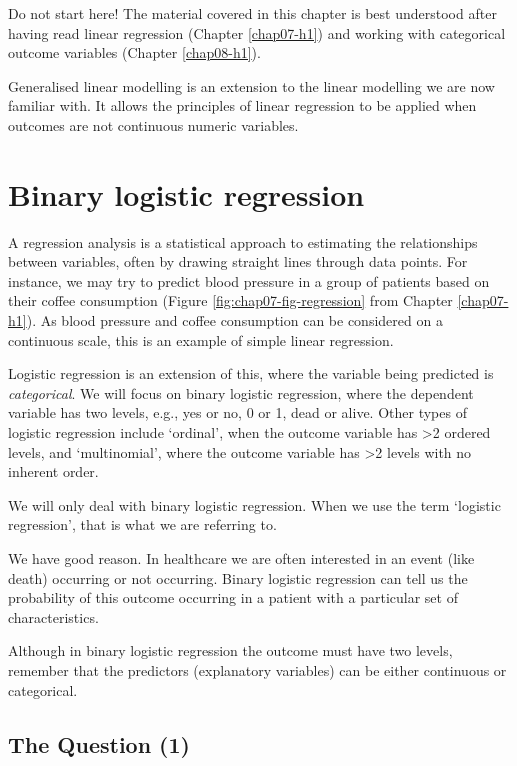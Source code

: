 \documentclass[
  12pt,
  krantz2]{krantz}
\begin{document}
Do not start here!
The material covered in this chapter is best understood after having read linear regression (Chapter \ref{chap07-h1}) and working with categorical outcome variables (Chapter \ref{chap08-h1}).

Generalised linear modelling is an extension to the linear modelling we are now familiar with.
It allows the principles of linear regression to be applied when outcomes are not continuous numeric variables.

\hypertarget{binary-logistic-regression}{%
\section{Binary logistic regression}\label{binary-logistic-regression}}


A regression analysis is a statistical approach to estimating the relationships between variables, often by drawing straight lines through data points.
For instance, we may try to predict blood pressure in a group of patients based on their coffee consumption (Figure \ref{fig:chap07-fig-regression} from Chapter \ref{chap07-h1}).
As blood pressure and coffee consumption can be considered on a continuous scale, this is an example of simple linear regression.

Logistic regression is an extension of this, where the variable being predicted is \emph{categorical}.
We will focus on binary logistic regression, where the dependent variable has two levels, e.g., yes or no, 0 or 1, dead or alive.
Other types of logistic regression include `ordinal', when the outcome variable has \textgreater2 ordered levels, and `multinomial', where the outcome variable has \textgreater2 levels with no inherent order.

We will only deal with binary logistic regression.
When we use the term `logistic regression', that is what we are referring to.

We have good reason.
In healthcare we are often interested in an event (like death) occurring or not occurring.
Binary logistic regression can tell us the probability of this outcome occurring in a patient with a particular set of characteristics.

Although in binary logistic regression the outcome must have two levels, remember that the predictors (explanatory variables) can be either continuous or categorical.

\hypertarget{the-question-1-1}{%
\subsection{The Question (1)}\label{the-question-1-1}}
\end{document}

